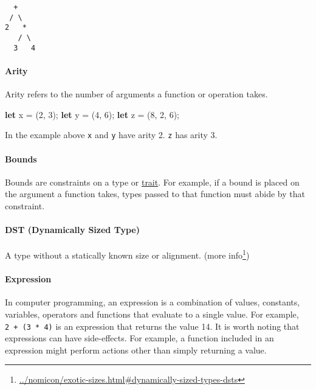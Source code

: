\documentclass[a4paper,]{book}
\newenvironment{Shaded}{\begin{snugshade}}{\end{snugshade}}
\newcommand{\KeywordTok}[1]{\textcolor[rgb]{0.13,0.29,0.53}{\textbf{{#1}}}}
\newcommand{\DecValTok}[1]{\textcolor[rgb]{0.00,0.00,0.81}{{#1}}}
\newcommand{\NormalTok}[1]{{#1}}
\renewcommand{\href}[2]{#2\footnote{\url{#1}}}
\let\oldparagraph\paragraph
\renewcommand{\paragraph}[1]{\oldparagraph{#1}\mbox{}}
\begin{document}
\begin{verbatim}
  +
 / \
2   *
   / \
  3   4
\end{verbatim}

\hypertarget{arity}{\paragraph{Arity}\label{arity}}

Arity refers to the number of arguments a function or operation takes.

\begin{Shaded}
\begin{Highlighting}[]
\KeywordTok{let} \NormalTok{x = (}\DecValTok{2}\NormalTok{, }\DecValTok{3}\NormalTok{);}
\KeywordTok{let} \NormalTok{y = (}\DecValTok{4}\NormalTok{, }\DecValTok{6}\NormalTok{);}
\KeywordTok{let} \NormalTok{z = (}\DecValTok{8}\NormalTok{, }\DecValTok{2}\NormalTok{, }\DecValTok{6}\NormalTok{);}
\end{Highlighting}
\end{Shaded}

In the example above \texttt{x} and \texttt{y} have arity 2. \texttt{z}
has arity 3.

\hypertarget{bounds}{\paragraph{Bounds}\label{bounds}}

Bounds are constraints on a type or
\protect\hyperlink{sec--traits}{trait}. For example, if a bound is
placed on the argument a function takes, types passed to that function
must abide by that constraint.

\paragraph{DST (Dynamically Sized
Type)}\label{dst-dynamically-sized-type}

A type without a statically known size or alignment.
(\href{../nomicon/exotic-sizes.html\#dynamically-sized-types-dsts}{more
info})

\hypertarget{expression}{\paragraph{Expression}\label{expression}}

In computer programming, an expression is a combination of values,
constants, variables, operators and functions that evaluate to a single
value. For example, \texttt{2\ +\ (3\ *\ 4)} is an expression that
returns the value 14. It is worth noting that expressions can have
side-effects. For example, a function included in an expression might
perform actions other than simply returning a value.
\end{document}
